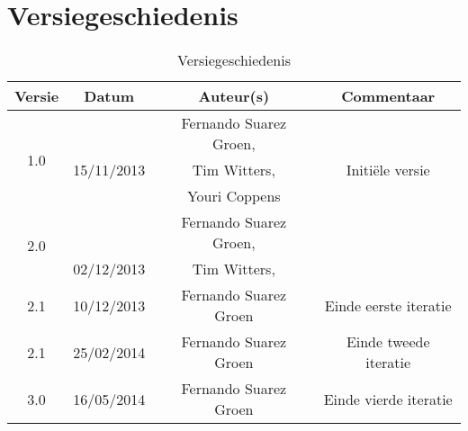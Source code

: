 \chapter{Versiegeschiedenis}

\begin{table}[htbp]
	\centering
	\begin{tabular} {|c|c|c|c|}
	    \hline
				\textbf{Versie} & \textbf{Datum} & \textbf{Auteur(s)} & \textbf{Commentaar} \\
		\hline
		\multirow{3}{*}{1.0 }   &  & Fernando Suarez Groen, &  \\
		                        & 15/11/2013  & Tim Witters,  & Initi\"{e}le versie\\
		                        &   & Youri Coppens & \\ 
		\hline
		\multirow{2}{*}{2.0 }   &  & Fernando Suarez Groen, &  \\
		                        & 02/12/2013  & Tim Witters, & \\ 
		\hline
		\multirow{1}{*}{2.1 }   & 10/12/2013  & Fernando Suarez Groen  & Einde eerste iteratie\\
		\hline
		\multirow{1}{*}{2.1 }   & 25/02/2014  & Fernando Suarez Groen  & Einde tweede iteratie\\ 
		\hline
		\multirow{1}{*}{3.0 }   & 16/05/2014  & Fernando Suarez Groen  & Einde vierde iteratie\\ 
		\hline
		                        
	\end{tabular}
	\caption{Versiegeschiedenis}
\end{table}